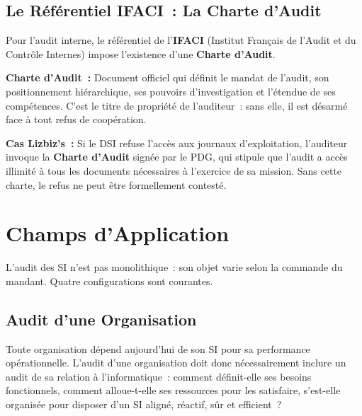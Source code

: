 \subsection{Le Référentiel IFACI~: La Charte d'Audit}
\label{subsec:charte-audit}

Pour l'audit interne, le référentiel de l'\textbf{IFACI} (Institut Français de
l'Audit et du Contrôle Internes) impose l'existence d'une \textbf{Charte d'Audit}.

\begin{boxdef}
\textbf{Charte d'Audit~:} Document officiel qui définit le mandat de l'audit,
son positionnement hiérarchique, ses pouvoirs d'investigation et l'étendue de
ses compétences. C'est le titre de propriété de l'auditeur~: sans elle, il est
désarmé face à tout refus de coopération.
\end{boxdef}

\begin{boxlizbiz}
\textbf{Cas Lizbiz's~:}
Si le DSI refuse l'accès aux journaux d'exploitation, l'auditeur invoque la
\textbf{Charte d'Audit} signée par le PDG, qui stipule que \og{}l'audit a accès
illimité à tous les documents nécessaires à l'exercice de sa mission\fg{}.
Sans cette charte, le refus ne peut être formellement contesté.
\end{boxlizbiz}

\section{Champs d'Application}
\label{sec:champs-application}

L'audit des SI n'est pas monolithique~: son objet varie selon la commande
du mandant. Quatre configurations sont courantes.

\subsection{Audit d'une Organisation}

Toute organisation dépend aujourd'hui de son SI pour sa performance opérationnelle.
L'audit d'une organisation doit donc nécessairement inclure un audit de sa relation
à l'informatique~: comment définit-elle ses besoins fonctionnels, comment alloue-t-elle
ses ressources pour les satisfaire, s'est-elle organisée pour disposer d'un SI aligné,
réactif, sûr et efficient~?

